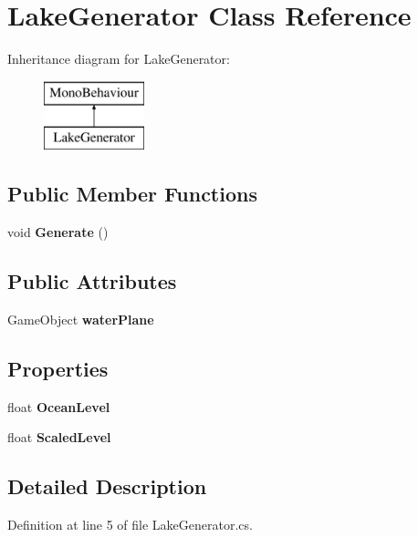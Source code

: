 \section{Lake\+Generator Class Reference}
\label{class_lake_generator}
Inheritance diagram for Lake\+Generator\+:\begin{figure}[H]
\begin{center}
\leavevmode
\includegraphics[height=2.000000cm]{class_lake_generator}
\end{center}
\end{figure}
\subsection*{Public Member Functions}
\begin{DoxyCompactItemize}
\item 
void \textbf{ Generate} ()
\end{DoxyCompactItemize}
\subsection*{Public Attributes}
\begin{DoxyCompactItemize}
\item 
Game\+Object \textbf{ water\+Plane}
\end{DoxyCompactItemize}
\subsection*{Properties}
\begin{DoxyCompactItemize}
\item 
float \textbf{ Ocean\+Level}\hspace{0.3cm}{\ttfamily  [get, set]}
\item 
float \textbf{ Scaled\+Level}\hspace{0.3cm}{\ttfamily  [get]}
\end{DoxyCompactItemize}


\subsection{Detailed Description}


Definition at line 5 of file Lake\+Generator.\+cs.



